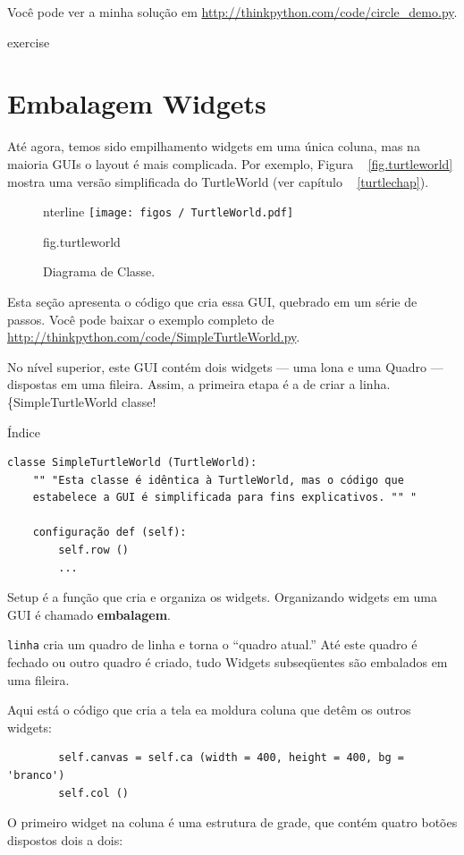 \documentclass[10pt]{book}
\begin{document}
\begin{exercise}
\begin{v erbatim}
{\begin{}
Você pode ver a minha solução em \url{http://thinkpython.com/code/circle_demo.py}.

\end{} exercise


\section{Embalagem Widgets}

Até agora, temos sido empilhamento widgets em uma única coluna, mas na maioria
GUIs o layout é mais complicada. Por exemplo,
Figura ~ \ref {fig.turtleworld} mostra uma versão simplificada do
TurtleWorld (ver capítulo ~ \ref {turtlechap}).

\begin{figure}
\Ce nterline {\texttt{[image: figos / TurtleWorld.pdf]}}
\caption{Diagrama de Classe.}
\label{} fig.turtleworld
\end{figure}


Esta seção apresenta o código que cria essa GUI, quebrado em um
série de passos. Você pode baixar o exemplo completo
de \url{http://thinkpython.com/code/SimpleTurtleWorld.py}.

No nível superior, este GUI contém dois widgets --- uma lona e uma
Quadro --- dispostas em uma fileira. Assim, a primeira etapa é a de criar a linha.
\{SimpleTurtleWorld classe!} Índice

\begin{verbatim}
classe SimpleTurtleWorld (TurtleWorld):
    "" "Esta classe é idêntica à TurtleWorld, mas o código que
    estabelece a GUI é simplificada para fins explicativos. "" "

    configuração def (self):
        self.row ()
        ...
\end{verbatim}
%
{Setup \tt} é a função que cria e organiza os widgets.
Organizando widgets em uma GUI é chamado {\bf embalagem}.

{\tt linha} cria um quadro de linha e torna o ``quadro atual.''
Até este quadro é fechado ou outro quadro é criado, tudo
Widgets subseqüentes são embalados em uma fileira.

Aqui está o código que cria a tela ea moldura coluna
que detêm os outros widgets:

\begin{verbatim}
        self.canvas = self.ca (width = 400, height = 400, bg = 'branco')
        self.col ()
\end{verbatim}
%
O primeiro widget na coluna é uma estrutura de grade, que contém
quatro botões dispostos dois a dois:


\end{v erbatim}
\end{exercise}
\end{document}
